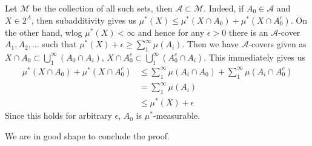 \documentclass[9pt]{report}
\newtheorem[L]{theorem}{Theorem}[chapter]
\newtheorem[L,nocut]{definition}[theorem]{Definition}
\newtheorem[S,nounderline]{remark}[theorem]{Remarks}
\begin{document}
Let \(\mathcal{M}\) be the collection of all such sets, then \(\mathcal{A}\subset \mathcal{M}\).
		Indeed, if \(A_0 \in \mathcal{A}\) and \(X\in 2^A\), then subadditivity gives us \(\mu^*(X) \leq \mu^*(X\cap A_0) + \mu^*(X\cap A_0^c)\). On the other hand, wlog \(\mu^*(X)<\infty\) and hence for any \(\epsilon>0\) there is an \(\mathcal{A}\)-cover \(A_1,A_2,...\) such that \(\mu^*(X) +\epsilon \geq \sum_1^\infty \mu(A_i)\). Then we have \(\mathcal{A}\)-covers given as \(X\cap A_0 \subset \bigcup_1^\infty (A_0\cap A_i)\), \(X \cap A_0^c \subset \bigcup_1^\infty (A_0^c \cap A_i)\). This immediately gives us 
		\begin{align*}
			\mu^*(X\cap A_0) + \mu^*(X\cap A_0^c) 
			&\leq \sum_1^\infty \mu(A_i\cap A_0) + \sum_1^\infty\mu(A_i\cap A_0^c) \\
			&= \sum_1^\infty \mu(A_i) \\
			&\leq \mu^*(X) + \epsilon
		\end{align*}
		Since this holds for arbitrary \(\epsilon\), \(A_0\) is \(\mu^*\)-measurable.

We are in good shape to conclude the proof.
\end{document}
